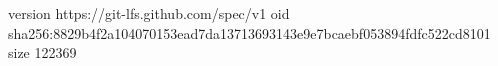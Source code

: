 version https://git-lfs.github.com/spec/v1
oid sha256:8829b4f2a104070153ead7da13713693143e9e7bcaebf053894fdfc522cd8101
size 122369
